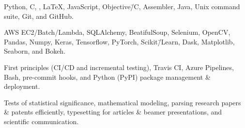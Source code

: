 
{%
	Python, C, \CPP\@, \LaTeX, JavaScript, Objective\=/C, Assembler, Java, Unix command suite, Git, and GitHub.
}
\vspace{0.5em}

{%
	AWS EC2/\nsp{}Batch/\nsp{}Lambda, SQLAlchemy, BeatifulSoup, Selenium, OpenCV, Pandas, Numpy, Keras, Tensorflow, PyTorch, Scikit\=/Learn, Dask, Matplotlib, Seaborn, and Bokeh.
}
\vspace{0.5em}

{%
	First principles (CI/CD and incremental testing), Travis CI, Azure Pipelines, Bash, pre-commit hooks, and Python (PyPI) package management \& deployment.
}
\vspace{0.5em}

{%
	Tests of statistical significance, mathematical modeling, parsing research papers \& patents efficiently, typesetting for articles \& beamer presentations, and scientific communication.
}


